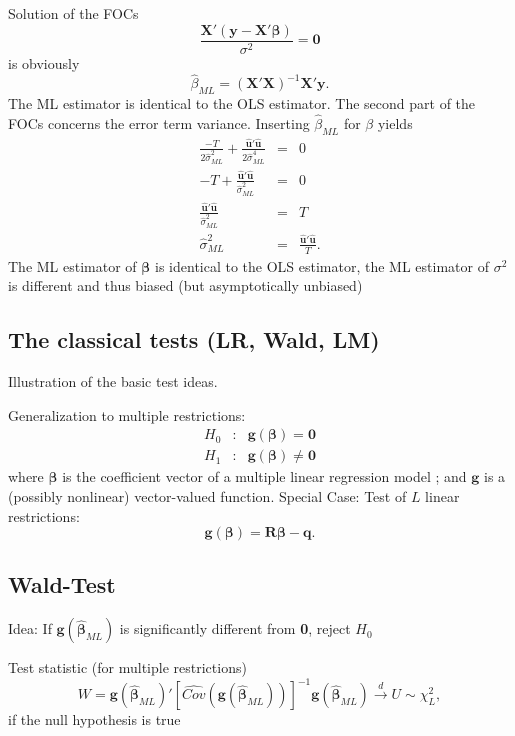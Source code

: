 \documentclass{article}
\begin{document}
 Solution of the FOCs
\[\frac{\mathbf{X}'\left( \mathbf{y}-\mathbf{X}'
\mathbf{\beta }\right) }{\sigma ^{2}}=\mathbf{0} \]
is obviously
\[\hat{\beta}_{ML}=(\mathbf{X}'\mathbf{X})^{-1}\mathbf{X}'
\mathbf{y}. \]
The ML estimator is identical to the OLS estimator. The second part of the
FOCs concerns the error term variance. Inserting
$\hat{\beta}_{ML}$ for $\beta $ yields
\begin{eqnarray*}
\frac{-T}{2\hat{\sigma}_{ML}^{2}}+\frac{\mathbf{\hat{u}}'
\mathbf{\hat{u}}}{2\hat{\sigma}_{ML}^{4}} &=&0 \\
-T+\frac{\mathbf{\hat{u}}'\mathbf{\hat{u}}}{\hat{\sigma}_{ML}^{2}}&=&0 \\
\frac{\mathbf{\hat{u}}'\mathbf{\hat{u}}}{\hat{\sigma}_{ML}^{2}} &=&T\\
\hat{\sigma}_{ML}^{2} &=&\frac{\mathbf{\hat{u}}'\mathbf{\hat{u}}}{T}.
\end{eqnarray*}
The ML estimator of $\mathbf{\beta }$ is identical to the OLS
estimator, the ML estimator of $\sigma ^{2}$ is different and thus biased
(but asymptotically unbiased)

\subsection*{The classical tests (LR, Wald, LM)}

Illustration of the basic test ideas.

Generalization to multiple restrictions:
\begin{eqnarray*}
H_{0} &:&\mathbf{g}(\mathbf{\beta })=\mathbf{0} \\
H_{1} &:&\mathbf{g}(\mathbf{\beta })\neq \mathbf{0}
\end{eqnarray*}
where $\mathbf{\beta }$ is the coefficient vector of a multiple linear
regression model ; and $\mathbf{g}$ is a (possibly nonlinear) vector-valued function. 
Special Case: Test of $L$ linear restrictions:
\[ \mathbf{g}(\mathbf{\beta })=\mathbf{R\beta }-\mathbf{q}.\]

\subsection*{Wald-Test}

Idea: If  $\mathbf{g}(\mathbf{\hat{\beta}}_{ML})$ is significantly
different from \textbf{0}, reject $H_{0}$

Test statistic (for multiple restrictions)
\begin{equation*}
W=\mathbf{g}\left( \mathbf{\hat{\beta}}_{ML}\right) '\left[ 
\widehat{Cov}\left( \mathbf{g}\left( \mathbf{\hat{\beta}}_{ML}\right)
\right) \right] ^{-1}\mathbf{g}\left( \mathbf{\hat{\beta}}_{ML}\right) 
\overset{d}{\rightarrow }U\sim \chi _{L}^{2},
\end{equation*}
if the null hypothesis is true
\end{document}
